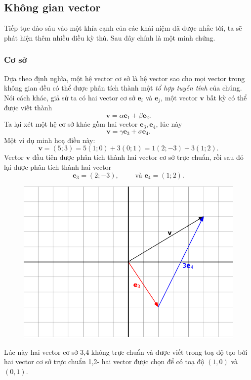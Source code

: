 \subsection{Không gian vector}
Tiếp tục đào sâu vào một khía cạnh của các khái niệm đã được nhắc tới, ta sẽ phát hiện thêm nhiều điều kỳ thú. Sau đây chính là một minh chứng.
\subsubsection*{Cơ sở}
Dựa theo định nghĩa, một hệ vector cơ sở là hệ vector sao cho mọi vector trong không gian đều có thể được phân tích thành một \emph{tổ hợp tuyến tính} của chúng. Nói cách khác, giả sử ta có hai vector cơ sở \(\mathbf{e}_i\) và \(\mathbf{e}_j\), một vector \(\mathbf{v}\) bất kỳ có thể được viết thành \[\mathbf{v}=\alpha\mathbf{e}_1 +\beta\mathbf{e}_2.\] Ta lại xét một hệ cơ sở khác gồm hai vector \(\mathbf{e}_{3}, \mathbf{e}_4\), lúc này \[\mathbf{v}=\gamma\mathbf{e}_3 +\sigma\mathbf{e}_4.\]
Một ví dụ  minh hoạ điều này:
\[\mathbf{v}= (5;3)=5(1;0)+3(0;1)=1(2;-3)
+3(1;2).\] Vector \(\mathbf{v}\) đầu tiên được phân tích thành hai vector cơ sở trực chuẩn, rồi sau đó lại được phân tích thành hai vector \[
\mathbf{e}_3 =(2;-3),\qquad \text{ và } \mathbf{e}_4 =(1;2).\] 
\begin{figure}[H]
    \centering
    \includegraphics[width=0.6\linewidth]{Tuan2/Figures/e3e4.png}
\end{figure}
Lúc này hai vector cơ sở 3,4 không trực chuẩn và được viết trong toạ độ tạo bởi hai vector cơ sở trực chuẩn 1,2- hai vector được chọn để có toạ độ \((1,0)\) và \((0,1)\).


